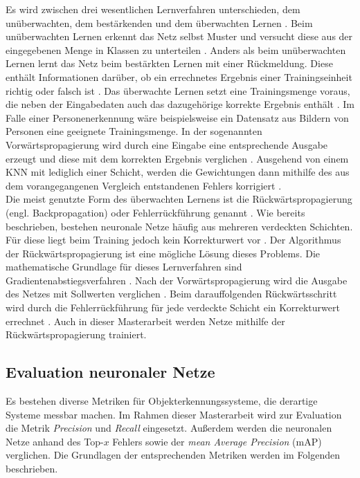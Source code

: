 		Es wird zwischen drei wesentlichen Lernverfahren unterschieden, dem unüberwachten, dem bestärkenden und dem überwachten Lernen \cite{Kriesel}. Beim unüberwachten Lernen erkennt das Netz selbst Muster und versucht diese aus der eingegebenen Menge in Klassen zu unterteilen \cite{Kriesel}. Anders als beim unüberwachten Lernen lernt das Netz beim bestärkten Lernen mit einer Rückmeldung. Diese enthält Informationen darüber, ob ein errechnetes Ergebnis einer Trainingseinheit richtig oder falsch ist \cite{Kriesel}. Das überwachte Lernen setzt eine Trainingsmenge voraus, die neben der Eingabedaten auch das dazugehörige korrekte Ergebnis enthält \cite{Kriesel,bildv2020}. Im Falle einer Personenerkennung wäre beispielsweise ein Datensatz aus Bildern von Personen eine geeignete Trainingsmenge. In der sogenannten Vorwärtspropagierung wird durch eine Eingabe eine entsprechende Ausgabe erzeugt und diese mit dem korrekten Ergebnis verglichen \cite{bildv2020}. Ausgehend von einem KNN mit lediglich einer Schicht, werden die Gewichtungen dann mithilfe des aus dem vorangegangenen Vergleich entstandenen Fehlers korrigiert \cite{bildv2020}.\\
		
		Die meist genutzte Form des überwachten Lernens ist die Rückwärtspropagierung (engl. Backpropagation) oder Fehlerrückführung genannt \cite{Ertel}. Wie bereits beschrieben, bestehen neuronale Netze häufig aus mehreren verdeckten Schichten. Für diese liegt beim Training jedoch kein Korrekturwert vor \cite{bildv2020}. Der Algorithmus der Rückwärtspropagierung ist eine mögliche Lösung dieses Problems. Die mathematische Grundlage für dieses Lernverfahren sind Gradientenabstiegsverfahren \cite{Kriesel,bildv2020}. Nach der Vorwärtspropagierung wird die Ausgabe des Netzes mit Sollwerten verglichen \cite{bildv2020}. Beim darauffolgenden Rückwärtsschritt wird durch die Fehlerrückführung für jede verdeckte Schicht ein Korrekturwert errechnet \cite{bildv2020}. Auch in dieser Masterarbeit werden Netze mithilfe der Rückwärtspropagierung trainiert.\\
		
	
		
		\subsection{Evaluation neuronaler Netze}
		\label{subsec: evaluation neuronaler netze}
		Es bestehen diverse Metriken für Objekterkennungssysteme, die derartige Systeme messbar machen. Im Rahmen dieser Masterarbeit wird zur Evaluation die Metrik \textit{Precision} und \textit{Recall} eingesetzt. Außerdem werden die neuronalen Netze anhand des Top-$x$ Fehlers sowie der \textit{mean Average Precision} (mAP) verglichen. Die Grundlagen der entsprechenden Metriken werden im Folgenden beschrieben.\\
		
